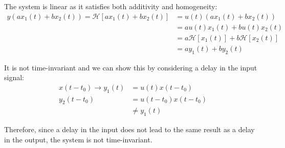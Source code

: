 \documentclass{article}
\begin{document}
\begin{enumerate}[label=5.\arabic*]
    The system is linear as it satisfies both additivity and homogeneity:
    \begin{align*}
        y(ax_1(t) + bx_2(t)) = \mathcal{H}[ax_1(t) + bx_2(t)] &= u(t)(ax_1(t) + bx_2(t)) \\
        &= au(t)x_1(t) + bu(t)x_2(t) \\
        &= a\mathcal{H}[x_1(t)] + b\mathcal{H}[x_2(t)] \\
        &= ay_1(t) + by_2(t)
    \end{align*}

    It is not time-invariant and we can show this by considering a delay in the input signal:
    \begin{align*}
        x(t-t_0) \rightarrow y_1(t) &= u(t)x(t-t_0) \\
        y_2(t-t_0) &= u(t-t_0)x(t-t_0) \\
        &\neq y_1(t)
    \end{align*}

    Therefore, since a delay in the input does not lead to the same result as a delay in the output, the system is not time-invariant.

\end{enumerate}



\end{document}
